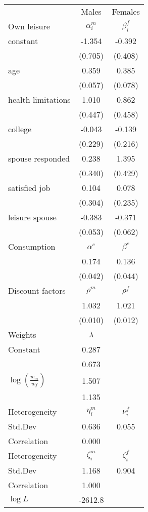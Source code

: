 \begin{tabular}{lcc} 
\hline\hline 
 & Males & Females \\ 
Own leisure & $\alpha_{i}^{m}$ & $\beta_{i}^{f}$ \\ 
constant & -1.354 & -0.392 \\ 
 & (0.705) & (0.408) \\ 
age & 0.359 & 0.385 \\ 
 & (0.057) & (0.078) \\ 
health limitations & 1.010 & 0.862 \\ 
 & (0.447) & (0.458) \\ 
college & -0.043 & -0.139 \\ 
 & (0.229) & (0.216) \\ 
spouse responded & 0.238 & 1.395 \\ 
 & (0.340) & (0.429) \\ 
satisfied job & 0.104 & 0.078 \\ 
 & (0.304) & (0.235) \\ 
leisure spouse & -0.383 & -0.371 \\ 
 & (0.053) & (0.062) \\ 
Consumption & $\alpha^{c}$ & $\beta^{c}$ \\ 
 & 0.174 & 0.136 \\ 
 & (0.042) & (0.044) \\ 
Discount factors & $\rho^m$ & $\rho^f$ \\ 
 & 1.032 & 1.021 \\ 
 & (0.010) & (0.012) \\ 
Weights & $\lambda$ &  \\ 
Constant & 0.287 &  \\ 
 & 0.673 &  \\ 
$\log(\frac{w_m}{w_f})$ & 1.507 &  \\ 
 & 1.135 &  \\ 
Heterogeneity & $\eta_i^m$ & $\nu_i^f$ \\ 
Std.Dev & 0.636 & 0.055 \\ 
Correlation & 0.000 &  \\ 
Heterogeneity & $\zeta_i^m$ & $\zeta_i^f$ \\ 
Std.Dev & 1.168 & 0.904 \\ 
Correlation & 1.000 &  \\ 
\hline 
$\log L$ & -2612.8 & \\ 
\hline \hline 
\end{tabular} 
